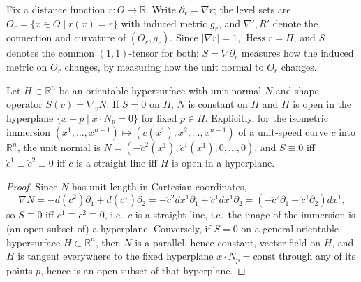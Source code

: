 \begin{definition}
  \label{def:pet-ch3-distance-function-notation}
  \leanok
  Fix a distance function $r:O\to\mathbb R$. Write $\partial_r=\nabla r$; the
  level sets are $O_r=\{x\in O\mid r(x)=r\}$ with induced metric $g_r$, and
  $\nabla',R'$ denote the connection and curvature of $(O_r,g_r)$. Since
  $|\nabla r|=1$, $\operatorname{Hess}r=\Pi$, and $S$ denotes the common
  $(1,1)$-tensor for both: $S=\nabla\partial_r$ measures how the induced metric
  on $O_r$ changes, by measuring how the unit normal to $O_r$ changes.
\end{definition}

\begin{example}[Example 3.2.9]
  \label{ex:pet-ch3-zero-shape-operator-hyperplane}
  \leanok
  Let $H\subset\mathbb R^n$ be an orientable hypersurface with unit normal $N$
  and shape operator $S(v)=\nabla_vN$. If $S=0$ on $H$, $N$ is constant on $H$
  and $H$ is open in the hyperplane $\{x+p\mid x\cdot N_p=0\}$ for fixed $p\in
  H$. Explicitly, for the isometric immersion
  $(x^1,\dots,x^{n-1})\mapsto(c(x^1),x^2,\dots,x^{n-1})$ of a unit-speed curve $c$
  into $\mathbb R^n$, the unit normal is $N=(-\dot c^2(x^1),\dot c^1(x^1),0,\dots,0)$,
  and $S\equiv0$ iff $\dot c^1\equiv\dot c^2\equiv0$ iff $c$ is a straight line
  iff $H$ is open in a hyperplane.
\end{example}
\begin{proof}
  Since $N$ has unit length in Cartesian coordinates,
  \[
    \nabla N=-d(\dot c^2)\partial_1+d(\dot c^1)\partial_2
    =-\ddot c^2dx^1\partial_1+\ddot c^1dx^1\partial_2
    =(-\ddot c^2\partial_1+\ddot c^1\partial_2)dx^1,
  \]
  so $S\equiv0$ iff $\ddot c^1\equiv\ddot c^2\equiv0$, i.e.\ $c$ is a straight
  line, i.e.\ the image of the immersion is (an open subset of) a hyperplane.
  Conversely, if $S=0$ on a general orientable hypersurface $H\subset\mathbb
  R^n$, then $N$ is a parallel, hence constant, vector field on $H$, and $H$ is
  tangent everywhere to the fixed hyperplane $x\cdot N_p=\text{const}$ through
  any of its points $p$, hence is an open subset of that hyperplane.
\end{proof}

